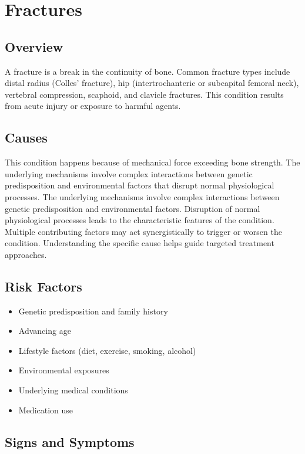 \chapter{Fractures}
\label{sec:Fractures}

\section{Overview}
A fracture is a break in the continuity of bone. Common fracture types include distal radius (Colles' fracture), hip (intertrochanteric or subcapital femoral neck), vertebral compression, scaphoid, and clavicle fractures. This condition results from acute injury or exposure to harmful agents.
\section{Causes}
This condition happens because of mechanical force exceeding bone strength. The underlying mechanisms involve complex interactions between genetic predisposition and environmental factors that disrupt normal physiological processes. The underlying mechanisms involve complex interactions between genetic predisposition and environmental factors. Disruption of normal physiological processes leads to the characteristic features of the condition. Multiple contributing factors may act synergistically to trigger or worsen the condition. Understanding the specific cause helps guide targeted treatment approaches.
\section{Risk Factors}


\begin{itemize}[noitemsep]
  \item Genetic predisposition and family history
  \item Advancing age
  \item Lifestyle factors (diet, exercise, smoking, alcohol)
  \item Environmental exposures
  \item Underlying medical conditions
  \item Medication use
\end{itemize}
\section{Signs and Symptoms}

